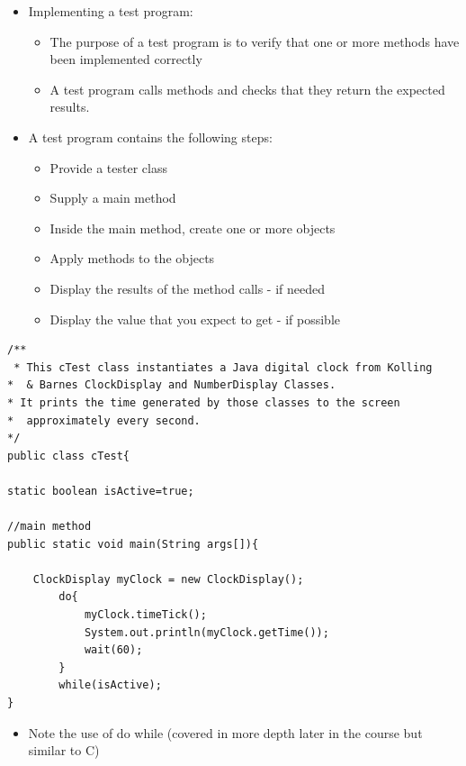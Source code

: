 \documentclass{beamer}
\begin{document}
\begin{frame}

\begin{itemize}
\item Implementing a test program:

\begin{itemize}
\item The purpose of a test program is to verify that one or more methods have been implemented correctly
\item A test program calls methods and checks that they return the expected results.
\end{itemize}
\end{itemize}

\end{frame}\begin{frame}

\begin{itemize}
\item A test program contains the following steps:

\begin{itemize}
\item Provide a tester class
\item Supply a main method
\item Inside the main method, create one or more objects
\item Apply methods to the objects
\item Display the results of the method calls - if needed
\item Display the value that you expect to get - if possible
\end{itemize}
\end{itemize}
\end{frame}


\begin{frame}[fragile]
\scriptsize
\begin{block}{}
\begin{lstlisting}
/**
 * This cTest class instantiates a Java digital clock from Kolling  
*  & Barnes ClockDisplay and NumberDisplay Classes. 
* It prints the time generated by those classes to the screen 
*  approximately every second.
*/
public class cTest{

static boolean isActive=true;

//main method
public static void main(String args[]){

    ClockDisplay myClock = new ClockDisplay();	
        do{
            myClock.timeTick();
            System.out.println(myClock.getTime());
            wait(60);			
        }
        while(isActive);	
}
\end{lstlisting}
\end{block}
\begin{itemize}
\item Note the use of do while (covered in more depth later in the course but similar to C)
\end{itemize}



\end{frame}
\end{document}
